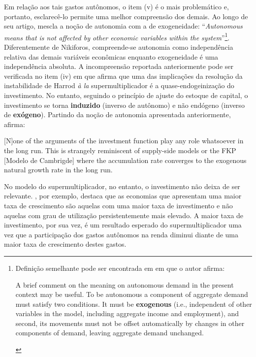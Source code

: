 Em relação aos tais gastos autônomos, o item (v) é o mais problemático e, portanto, esclarecê-lo permite uma melhor compreensão dos demais. Ao longo de seu artigo, \textcite[p.~4]{nikiforos_comments_2018} mescla a noção de autonomia com a de exogeneidade: ``\textit{Autonomous means that is not affected by other economic variables within the system}''\footnote{
	Definição semelhante pode ser encontrada em \textcite[p.~2, grifos adicionados]{skott_autonomous_2017} em que o autor afirma:
	
	\begin{citacao}
		A brief comment on the meaning on autonomous demand in the present context may be useful. To
		be autonomous a component of aggregate demand must satisfy two conditions. It must be \textbf{exogenous}
		(i.e., independent of other variables in the model, including aggregate income and employment), and
		second, its movements must not be offset automatically by changes in other components of demand,
		leaving aggregate demand unchanged.
	\end{citacao}	
}. Diferentemente de Nikiforos, compreende-se autonomia como independência relativa das demais variáveis econômicas enquanto exogeneidade é uma independência absoluta. 
A incompreensão reportada anteriormente pode ser verificada no item (iv) em que afirma que uma das implicações da resolução da instabilidade de Harrod \textit{à la} supermultiplicador é a quase-endogeinização do investimento. No entanto, seguindo o princípio de ajuste do estoque de capital, o investimento se torna \textbf{induzido} (inverso de autônomo) e não endógeno (inverso de \textbf{exógeno}). Partindo da noção de autonomia apresentada anteriormente, \citeauthor*{nikiforos_comments_2018} afirma:

\begin{citacao}
	
	[N]one of the arguments of the investment function play any role whatsoever in the long run. This is strangely
	reminiscent of supply-side models or the FKP [Modelo de Cambrigde] where the accumulation rate converges to the
	exogenous natural growth rate in the long run. \cite[p.~11--12, comentario adicionado]{nikiforos_comments_2018}
\end{citacao}
No modelo do supermultiplicador, no entanto, o investimento não deixa de ser relevante. \textcite{dejuan_hidden_2017}, por exemplo, destaca que as economias que apresentam uma maior taxa de crescimento são aquelas com uma maior taxa de investimento e não aquelas com grau de utilização persistentemente mais elevado. A maior taxa de investimento, por sua vez, é um resultado esperado do supermultiplicador uma vez que a participação dos gastos autônomos na renda diminui diante de uma maior taxa de crescimento destes gastos.

